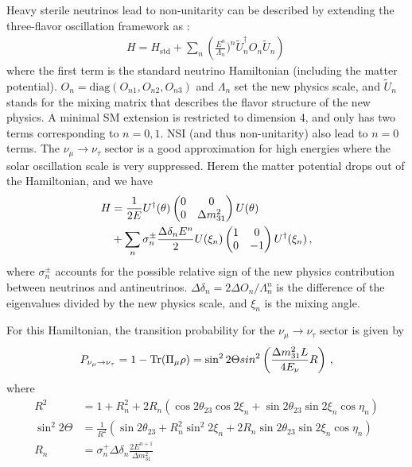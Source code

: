 \documentclass[twocolumn]{article}
\newcommand{\nmt}{\ensuremath{\nu_\mu \to \nu_\tau}}
\renewcommand{\th}[1][]{%
  \theta\ifx\\#1\\\else_\text{#1}\fi
}
\renewcommand{\t}[1]{\ensuremath{\text{{#1}}}}
\newcommand*{\dm}[1][]{%
  \Delta m^2\ifx\\#1\\\else_\text{#1}\fi
}
\begin{document}
Heavy sterile neutrinos lead to non-unitarity can be described by extending the three-flavor oscillation framework as :
\begin{align*}
  H = H_\t{std} + \sum_n \left(\frac{E^n}{\Lambda_n})^n \tilde{U}^\dagger_n O_n \tilde{U}_n\right)
\,\end{align*}
where the first term is the standard neutrino Hamiltonian (including the matter potential). $O_n = \t{diag}(O_{n1}, O_{n2}, O_{n3})$ and $\Lambda_n$ set the new physics scale, and $\tilde{U}_n$ stands for the mixing matrix that describes the flavor structure of the new physics. A minimal SM extension is restricted to dimension 4, and only has two terms corresponding to $n = 0,1$. NSI (and thus non-unitarity) also lead to $n=0$ terms. 
The $\nmt$ sector is a good approximation for high energies where the solar oscillation scale is very suppressed. Herem the matter potential drops out of the Hamiltonian, and we have
\begin{align*}
  H &= \frac{1}{2E}U^\dagger(\th)\begin{pmatrix} 
                                  0 & 0 \\
                                  0 & \dm[31]
                                \end{pmatrix}
                  U(\th) \\
    &+ \sum_n \sigma^\pm_n \frac{\Delta \delta_n E^n}{2}U(\xi_n) \begin{pmatrix} 1 & 0 \\ 0 & -1 \end{pmatrix}U^\dagger(\xi_n)
\,,\end{align*}  
where $\sigma^\pm_n$ accounts for the possible relative sign of the new physics contribution between neutrinos and antineutrinos. $\Delta \delta_n = 2 \Delta O_n / \Lambda ^n_n$ is the difference of the eigenvalues divided by the new physics scale, and $\xi_n$ is the mixing angle.

For this Hamiltonian, the transition probability for the $\nmt$ sector is given by
\begin{align*}
  P_{\nmt} = 1- \t{Tr}(\Pi_\mu \rho) = \sin^2 2\Theta sin^2 \left( \frac{\dm[31]L}{4E_\nu}R \right)
\,,\end{align*}
where
\begin{align*}
  R^{2}&=1+R_{n}^{2}+2R_{n}\left(\cos 2\theta_{23}\cos 2\xi_{n}+\sin 2 \theta_{23} \sin 2\xi_{n} \cos \eta_{n}\right)\\
  \sin ^{2} 2 \Theta &= \frac{1}{R^{2}}\left(\sin 2 \theta_{23}+R_{n}^{2} \sin ^{2} 2 \xi_{n}+2 R_{n} \sin 2 \theta_{23} \sin 2 \xi_{n} \cos \eta_{n}\right) \\
  R_{n}&=\sigma_{n}^{+} \Delta \delta_{n} \frac{2 E^{n+1}}{\Delta m_{31}^{2}}
\,\end{align*}
\end{document}
